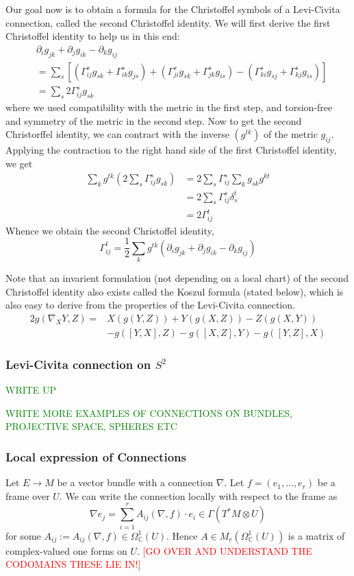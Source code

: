 \documentclass[a4paper]{article}
\theoremstyle{definition} \newtheorem*{definition}{Definition}
\theoremstyle{definition} \newtheorem*{definitions}{Definitions}
\theoremstyle{plain} \newtheorem{theorem}{Theorem}[section]
\theoremstyle{plain} \newtheorem{proposition}[theorem]{Proposition}
\theoremstyle{plain} \newtheorem{corollary}[theorem]{Corollary}
\theoremstyle{plain} \newtheorem{lemma}[theorem]{Lemma}
\theoremstyle{plain} \newtheorem{example}[theorem]{Example}
\newcommand{\checkCorrect}[1]{\textcolor{red}{#1}}
\newcommand{\finish}[1]{\textcolor{green}{#1}}
\newcommand{\complexnos}{\mathbb{C}}
\begin{document}
Our goal now is to obtain a formula for the Christoffel symbols of a Levi-Civita connection, called the second Christoffel identity. We will first derive the first Christoffel identity to help us in this end:
\begin{align*}
    & \partial_i g_{jk} + \partial_j g_{ik} - \partial_k g_{ij} \\
    & = \sum_s [(\Gamma^s_{ij}g_{sk}+\Gamma^s_{ik}g_{js})+
    (\Gamma^s_{ji}g_{sk}+\Gamma^s_{jk}g_{is})-
    (\Gamma^s_{ki}g_{sj}+\Gamma^s_{kj}g_{is})] \\
    & = \sum_s 2\Gamma^s_{ij}g_{sk}
\end{align*}
where we used compatibility with the metric in the first step, and torsion-free and symmetry of the metric in the second step. Now to get the second Christorffel identity, we can contract with the inverse $(g^{tk})$ of the metric $g_{ij}$. Applying the contraction to the right hand side of the first Christoffel identity, we get
\begin{align*}
    \sum_k g^{tk}(2\sum_s \Gamma^s_{ij}g_{sk}) 
    & = 2\sum_s \Gamma^s_{ij}\sum_k g_{sk}g^{kt} \\
    & = 2 \sum_s \Gamma^s_{ij}\delta^t_s \\
    & = 2\Gamma^t_{ij}
\end{align*}
Whence we obtain the second Christoffel identity,
$$\Gamma^t_{ij} = \frac{1}{2}\sum_k g^{tk}(\partial_i g_{jk} + \partial_j g_{ik} - \partial_k g_{ij})$$

Note that an invarient formulation (not depending on a local chart) of the second Christoffel identity also exists called the Koszul formula (stated below), which is also easy to derive from the properties of the Levi-Civita connection.
\begin{align*}
2g(\nabla_XY, Z) = & X(g(Y,Z))+Y(g(X,Z))-Z(g(X,Y)) \\
& -g([Y,X],Z)-g([X,Z],Y)-g([Y,Z],X)    
\end{align*}

\subsubsection{Levi-Civita connection on $S^2$}
\finish{WRITE UP}

\finish{WRITE MORE EXAMPLES OF CONNECTIONS ON BUNDLES, PROJECTIVE SPACE, SPHERES ETC}

\subsubsection{Local expression of Connections}
Let $E\to M$ be a vector bundle with a connection $\nabla$.  Let $f=(e_1, \ldots, e_r)$ be a frame over $U$.  We can write the connection locally with respect to the frame as
$$\nabla e_j = \sum_{i=1}^r A_{ij}(\nabla, f)\cdot e_i \in \Gamma(T^*M\otimes U)$$
for some $A_{ij}:=A_{ij}(\nabla, f) \in \Omega_\complexnos^1(U)$.  Hence $A\in M_r(\Omega_\complexnos^1(U))$ is a matrix of complex-valued one forms on $U$. 
\checkCorrect{[GO OVER AND UNDERSTAND THE CODOMAINS THESE LIE IN!]}
\end{document}
